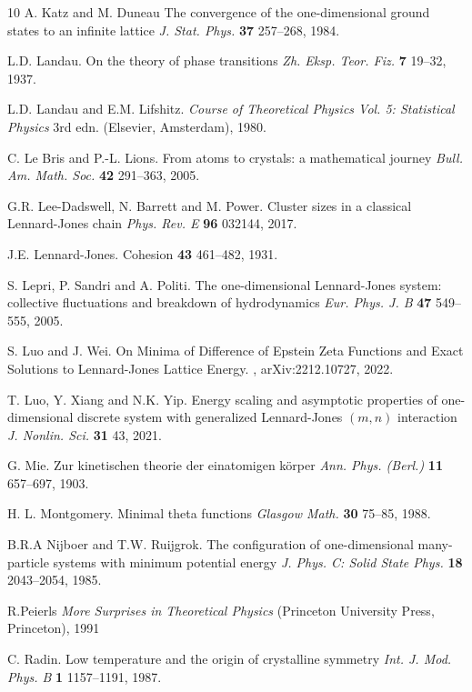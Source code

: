\documentclass[12pt]{iopart}
\theoremstyle{definition}
\begin{document}
\begin{thebibliography}{10}
 A. Katz and M. Duneau
The convergence of the one-dimensional ground states to an infinite lattice
{\it J. Stat. Phys.} {\bf 37} 257--268, 1984.  

 L.D. Landau.
On the theory of phase transitions
{\it Zh. Eksp. Teor. Fiz.} {\bf 7} 19--32, 1937.

 L.D. Landau and E.M. Lifshitz.
{\it Course of Theoretical Physics Vol. 5: Statistical Physics}
3rd edn. (Elsevier, Amsterdam), 1980.

 C. Le Bris and P.-L. Lions.
From atoms to crystals: a mathematical journey
{\it Bull. Am. Math. Soc.} {\bf 42} 291--363, 2005.

 G.R. Lee-Dadswell, N. Barrett and M. Power. 
Cluster sizes in a classical Lennard-Jones chain
{\it Phys. Rev. E} {\bf 96} 032144, 2017.

J.E. Lennard-Jones.
\newblock Cohesion
 {\bf 43} 461--482, 1931.

 S. Lepri, P. Sandri and A. Politi.
The one-dimensional Lennard-Jones system: collective fluctuations
and breakdown of hydrodynamics  
{\it Eur. Phys. J. B} {\bf 47} 549--555, 2005.

S. Luo and J. Wei.
\newblock On Minima of Difference of Epstein Zeta Functions and Exact Solutions to Lennard-Jones Lattice Energy.
, arXiv:2212.10727, 2022.

 T. Luo, Y. Xiang and N.K. Yip.
Energy scaling and asymptotic properties of one-dimensional discrete system
with generalized Lennard-Jones $(m,n)$ interaction  
{\it J. Nonlin. Sci.} {\bf 31} 43, 2021.

 G. Mie.
Zur kinetischen theorie der einatomigen k\"orper
{\it Ann. Phys. (Berl.)} {\bf 11} 657--697, 1903. 

 H. L. Montgomery.
Minimal theta functions
{\it Glasgow Math.} {\bf 30} 75--85, 1988.

 B.R.A Nijboer and T.W. Ruijgrok. 
The configuration of one-dimensional many-particle systems
with minimum potential energy
{\it J. Phys. C: Solid State Phys.} {\bf 18} 2043--2054, 1985.

R.Peierls
{\em More Surprises in Theoretical Physics}
(Princeton University Press, Princeton), 1991

 C. Radin.
Low temperature and the origin of crystalline symmetry
{\it Int. J. Mod. Phys. B} {\bf 1} 1157--1191, 1987.


\end{thebibliography}
\end{document}
